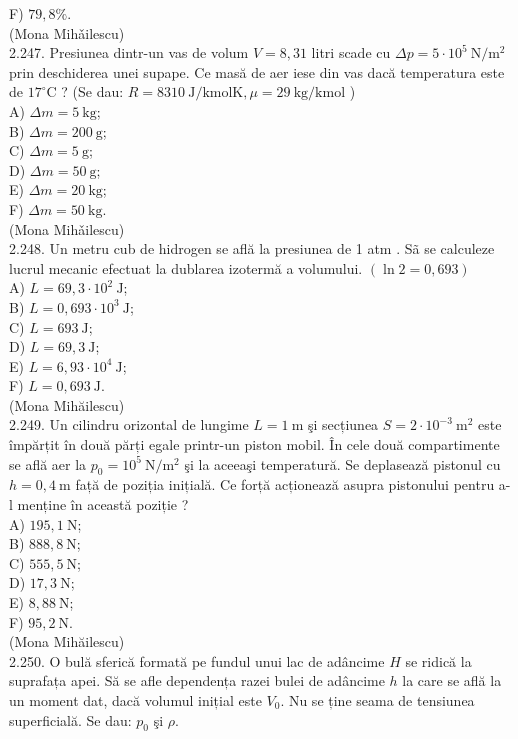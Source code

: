 \documentclass[10pt]{article}
\begin{document}
F) $79,8 \%$.\\
(Mona Mihǎilescu)\\
2.247. Presiunea dintr-un vas de volum $V=8,31$ litri scade cu $\Delta p=5 \cdot 10^{5} \mathrm{~N} / \mathrm{m}^{2}$ prin deschiderea unei supape. Ce masă de aer iese din vas dacă temperatura este de $17^{\circ} \mathrm{C}$ ? (Se dau: $R=8310 \mathrm{~J} / \mathrm{kmolK}, \mu=29 \mathrm{~kg} / \mathrm{kmol}$ )\\
A) $\Delta m=5 \mathrm{~kg}$;\\
B) $\Delta m=200 \mathrm{~g}$;\\
C) $\Delta m=5 \mathrm{~g}$;\\
D) $\Delta m=50 \mathrm{~g}$;\\
E) $\Delta m=20 \mathrm{~kg}$;\\
F) $\Delta m=50 \mathrm{~kg}$.\\
(Mona Mihǎilescu)\\
2.248. Un metru cub de hidrogen se află la presiunea de 1 atm . Sã se calculeze lucrul mecanic efectuat la dublarea izotermă a volumului. $(\ln 2=0,693)$\\
A) $L=69,3 \cdot 10^{2} \mathrm{~J}$;\\
B) $L=0,693 \cdot 10^{3} \mathrm{~J}$;\\
C) $L=693 \mathrm{~J}$;\\
D) $L=69,3 \mathrm{~J}$;\\
E) $L=6,93 \cdot 10^{4} \mathrm{~J}$;\\
F) $L=0,693 \mathrm{~J}$.\\
(Mona Mihăilescu)\\
2.249. Un cilindru orizontal de lungime $L=1 \mathrm{~m}$ şi secțiunea $S=2 \cdot 10^{-3} \mathrm{~m}^{2}$ este împărțit în două părți egale printr-un piston mobil. În cele două compartimente se află aer la $p_{0}=10^{5} \mathrm{~N} / \mathrm{m}^{2}$ şi la aceeaşi temperatură. Se deplasează pistonul cu $h=0,4 \mathrm{~m}$ față de poziția inițială. Ce forță acționează asupra pistonului pentru a-l menține în această poziție ?\\
A) $195,1 \mathrm{~N}$;\\
B) $888,8 \mathrm{~N}$;\\
C) $555,5 \mathrm{~N}$;\\
D) $17,3 \mathrm{~N}$;\\
E) $8,88 \mathrm{~N}$;\\
F) $95,2 \mathrm{~N}$.\\
(Mona Mihăilescu)\\
2.250. O bulă sferică formată pe fundul unui lac de adâncime $H$ se ridică la suprafața apei. Să se afle dependența razei bulei de adâncime $h$ la care se află la un moment dat, dacă volumul inițial este $V_{0}$. Nu se ține seama de tensiunea superficială. Se dau: $p_{0}$ şi $\rho$.\\
\end{document}
